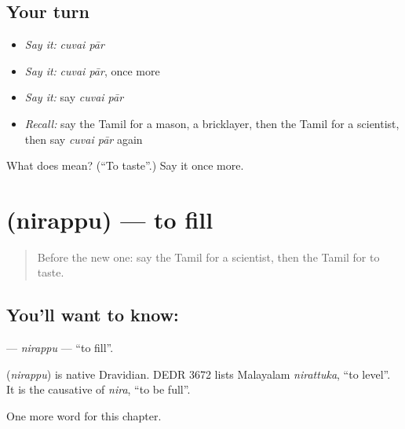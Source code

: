 \subsection*{Your turn}
\begin{itemize}
\raggedright
  \item \emph{Say it:} \emph{cuvai pār}
  \item \emph{Say it:} \emph{cuvai pār}, once more
  \item \emph{Say it:} say \emph{cuvai pār}
  \item \emph{Recall:} say the Tamil for a mason, a bricklayer, then the Tamil for a scientist, then say \emph{cuvai pār} again
\end{itemize}

\begin{tcolorbox}[breakable,colback=teal!4,colframe=teal!35!black,title={Before you move on}]
What does   mean? (\textquotedblleft{}To taste\textquotedblright{}.) Say it once more.
\end{tcolorbox}
\section[\texorpdfstring{\ta{நிரப்பு} (nirappu)}{நிரப்பு (nirappu)}]{ (nirappu) — to fill}

\label{lesson:TA-C225-nirappu}



\begin{quote}
Before the new one: say the Tamil for a scientist, then the Tamil for to taste.
\end{quote}

\subsection*{You'll want to know: }
\textbf{} — \emph{nirappu} — \textquotedblleft{}to fill\textquotedblright{}.

\begin{cousinweb}
\textbf{} (\emph{nirappu}) is native Dravidian. DEDR 3672 lists Malayalam \emph{nirattuka}, \textquotedblleft{}to level\textquotedblright{}. It is the causative of \emph{nira}, \textquotedblleft{}to be full\textquotedblright{}.
\end{cousinweb}

\begin{grammarlens}[title={What you've built}]
One more word for this chapter.
\end{grammarlens}

